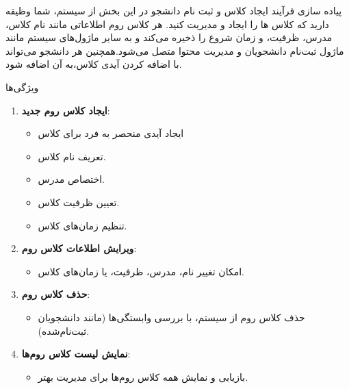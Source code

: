 

{پیاده سازی فرآیند ایجاد کلاس و ثبت نام دانشجو}
در این بخش از سیستم، شما وظیقه دارید که کلاس ها را ایجاد و مدیریت کنید. هر کلاس روم اطلاعاتی مانند نام کلاس، مدرس، ظرفیت، و زمان شروع را ذخیره می‌کند و به سایر ماژول‌های سیستم مانند ماژول ثبت‌نام دانشجویان و مدیریت محتوا متصل می‌شود.همچنین هر دانشجو می‌تواند با اضافه کردن آیدی کلاس،به آن اضافه شود.

{ویژگی‌ها}
\begin{enumerate}
    \item \textbf{ایجاد کلاس روم جدید}:
    \begin{itemize}
        \item ایجاد آیدی منحصر به فرد برای کلاس
        \item تعریف نام کلاس.
        \item اختصاص مدرس.
        \item تعیین ظرفیت کلاس.
        \item تنظیم زمان‌های کلاس.
    \end{itemize}
    \item \textbf{ویرایش اطلاعات کلاس روم}:
    \begin{itemize}
        \item امکان تغییر نام، مدرس، ظرفیت، یا زمان‌های کلاس.
    \end{itemize}
    \item \textbf{حذف کلاس روم}:
    \begin{itemize}
        \item حذف کلاس روم از سیستم، با بررسی وابستگی‌ها (مانند دانشجویان ثبت‌نام‌شده).
    \end{itemize}
    \item \textbf{نمایش لیست کلاس روم‌ها}:
    \begin{itemize}
        \item بازیابی و نمایش همه کلاس روم‌ها برای مدیریت بهتر.
    \end{itemize}
\end{enumerate}



